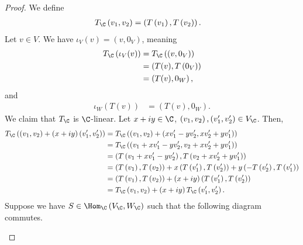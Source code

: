 \documentclass[10pt]{mypackage}
\begin{document}
\begin{proof}
  We define
  \begin{align*}
    T_{\C}\left(v_1,v_2\right) &= \left(T\left(v_1\right),T\left(v_2\right)\right).
  \end{align*}
  Let $v\in V$. We have $\iota_V(v) = \left(v,0_V\right)$, meaning
  \begin{align*}
    T_{\C}\left(\iota_V(v)\right) &= T_{\C}\left(\left(v,0_V\right)\right)\\
                                  &= \left(T(v),T\left(0_V\right)\right)\\
                                  &= \left(T(v),0_W\right),
  \end{align*}
  and
  \begin{align*}
    \iota_W\left(T(v)\right) &= \left(T(v),0_W\right).
  \end{align*}
  We claim that $T_{\C}$ is $\C$-linear. Let $x + iy\in \C$, $\left(v_1,v_2\right), \left(v_1',v_2'\right)\in V_{\C}$. Then,
  \begin{align*}
    T_{\C}\left(\left(v_1,v_2\right) + \left(x + iy\right)\left(v_1',v_2'\right)\right) &= T_{\C}\left(\left(v_1,v_2\right) + \left(xv_1' - yv_2',xv_2' + yv_1'\right)\right)\\
                                                                                        &= T_{\C}\left(\left(v_1 + xv_1' - yv_2',v_2 + xv_2' + yv_1'\right)\right)\\
                                                                                        &= \left(T\left(v_1 + xv_1' - yv_2'\right),T\left(v_2 + xv_2' + yv_1'\right)\right)\\
                                                                                        &= \left(T\left(v_1\right),T\left(v_2\right)\right) + x\left(T\left(v_1'\right),T\left(v_2'\right)\right) + y\left(-T\left(v_2'\right),T\left(v_1'\right)\right)\\
                                                                                        &= \left(T\left(v_1\right),T\left(v_2\right)\right) + \left(x + iy\right)\left(T\left(v_1'\right),T\left(v_2'\right)\right)\\
                                                                                        &= T_{\C}\left(v_1,v_2\right) + \left(x + iy\right)T_{\C}\left(v_1',v_2'\right).
  \end{align*}
  Suppose we have $S\in \Hom_{\C}\left(V_{\C},W_{\C}\right)$ such that the following diagram commutes.
\begin{center}

\end{center}
\end{proof}
\end{document}
